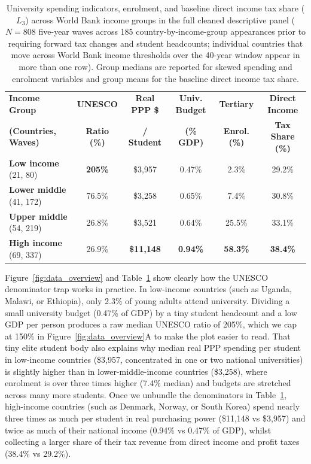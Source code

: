 \documentclass[11pt,a4paper]{article}
\providecommand{\FloatBarrier}{}
\newcommand{\co}{\cellcolor{colodd}}
\newcommand{\ce}{\cellcolor{coleven}}
\begin{document}
\begin{table}[htbp]
  \centering
  \caption{University spending indicators, enrolment, and baseline direct income tax share ($L_3$) across World Bank income groups in the full cleaned descriptive panel ($N = 808$ five-year waves across 185 country-by-income-group appearances prior to requiring forward tax changes and student headcounts; individual countries that move across World Bank income thresholds over the 40-year window appear in more than one row). Group medians are reported for skewed spending and enrolment variables and group means for the baseline direct income tax share.}
  \label{tab:eda1}
  \small
  \setlength{\tabcolsep}{4.8pt}
  \begin{tabular}{l|c|c|c|c|c}
    \toprule
    \rowcolor{tabhead}
    \textbf{Income Group} & \textbf{UNESCO} & \textbf{Real PPP \$} & \textbf{Univ. Budget} & \textbf{Tertiary} & \textbf{Direct Income} \\
    \rowcolor{tabhead}
    \textbf{(Countries, Waves)} & \textbf{Ratio (\%)} & \textbf{/ Student} & \textbf{(\% GDP)} & \textbf{Enrol. (\%)} & \textbf{Tax Share (\%)} \\
    \midrule
    \rowcolor{rowodd}
    \textbf{Low income} (21, 80) & \co \textbf{205\%} & \$3,957 & \co 0.47\% & 2.3\% & \co 29.2\% \\
    \rowcolor{roweven}
    \textbf{Lower middle} (41, 172) & \ce 76.5\% & \$3,258 & \ce 0.65\% & 7.4\% & \ce 30.8\% \\
    \rowcolor{rowodd}
    \textbf{Upper middle} (54, 219) & \co 26.8\% & \$3,521 & \co 0.64\% & 25.5\% & \co 33.1\% \\
    \rowcolor{roweven}
    \textbf{High income} (69, 337) & \ce 26.9\% & \textbf{\$11,148}& \ce \textbf{0.94\%} & \textbf{58.3\%} & \ce \textbf{38.4\%} \\
    \bottomrule
  \end{tabular}
\end{table}
\FloatBarrier

Figure~\ref{fig:data_overview} and Table~\ref{tab:eda1} show clearly how the UNESCO denominator trap works in practice. In low-income countries (such as Uganda, Malawi, or Ethiopia), only 2.3\% of young adults attend university. Dividing a small university budget (0.47\% of GDP) by a tiny student headcount and a low GDP per person produces a raw median UNESCO ratio of 205\%, which we cap at 150\% in Figure~\ref{fig:data_overview}A to make the plot easier to read. That tiny elite student body also explains why median real PPP spending per student in low-income countries (\$3,957, concentrated in one or two national universities) is slightly higher than in lower-middle-income countries (\$3,258), where enrolment is over three times higher (7.4\% median) and budgets are stretched across many more students. Once we unbundle the denominators in Table~\ref{tab:eda1}, high-income countries (such as Denmark, Norway, or South Korea) spend nearly three times as much per student in real purchasing power (\$11,148 vs \$3,957) and twice as much of their national income (0.94\% vs 0.47\% of GDP), whilst collecting a larger share of their tax revenue from direct income and profit taxes (38.4\% vs 29.2\%).
\end{document}
